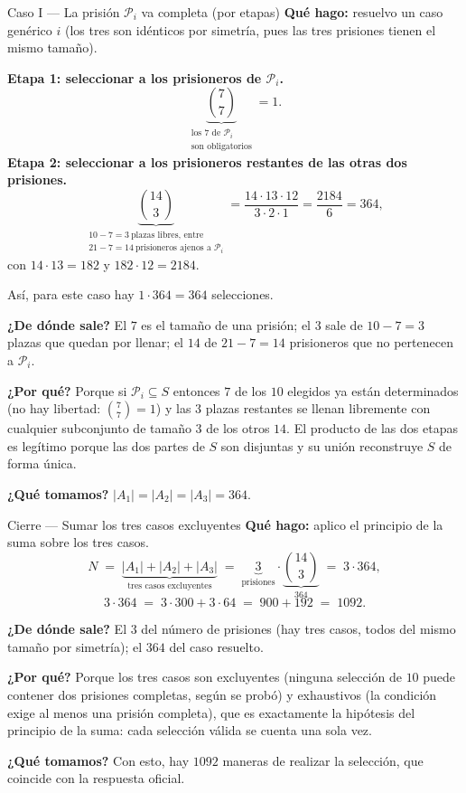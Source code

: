 \documentclass[11pt]{article}
\begin{document}
\begin{paso}{Caso I --- La prisi\'on $\mathcal{P}_i$ va completa (por etapas)}
\textbf{Qu\'e hago:} resuelvo un caso gen\'erico $i$ (los tres son id\'enticos por simetr\'ia, pues las tres
prisiones tienen el mismo tama\~no).

\medskip
\textbf{Etapa 1: seleccionar a los prisioneros de $\mathcal{P}_i$.}
\[
\underbrace{\binom{7}{7}}_{\substack{\text{los 7 de }\mathcal{P}_i\\ \text{son obligatorios}}}=1 .
\]
\textbf{Etapa 2: seleccionar a los prisioneros restantes de las otras dos prisiones.}
\[
\underbrace{\binom{14}{3}}_{\substack{10-7=3\ \text{plazas libres, entre}\\ 21-7=14\ \text{prisioneros ajenos a }\mathcal{P}_i}}
=\frac{14\cdot 13\cdot 12}{3\cdot 2\cdot 1}=\frac{2184}{6}=364 ,
\]
con $14\cdot 13=182$ y $182\cdot 12=2184$.

\medskip
As\'i, para este caso hay $1\cdot 364=364$ selecciones.

\textbf{¿De d\'onde sale?} El $7$ es el tama\~no de una prisi\'on; el $3$ sale de $10-7=3$ plazas que quedan
por llenar; el $14$ de $21-7=14$ prisioneros que no pertenecen a $\mathcal{P}_i$.

\textbf{¿Por qu\'e?} Porque si $\mathcal{P}_i\subseteq S$ entonces $7$ de los $10$ elegidos ya est\'an
determinados (no hay libertad: $\binom{7}{7}=1$) y las $3$ plazas restantes se llenan libremente con
cualquier subconjunto de tama\~no $3$ de los otros $14$. El producto de las dos etapas es leg\'itimo porque
las dos partes de $S$ son disjuntas y su uni\'on reconstruye $S$ de forma \'unica.

\textbf{¿Qu\'e tomamos?} $|A_1|=|A_2|=|A_3|=364$.
\end{paso}

\begin{paso}{Cierre --- Sumar los tres casos excluyentes}
\textbf{Qu\'e hago:} aplico el principio de la suma sobre los tres casos.
\[
N\;=\;\underbrace{|A_1|+|A_2|+|A_3|}_{\text{tres casos excluyentes}}
\;=\;\underbrace{3}_{\text{prisiones}}\cdot\underbrace{\binom{14}{3}}_{364}
\;=\;3\cdot 364 ,
\]
\[
3\cdot 364\;=\;3\cdot 300+3\cdot 64\;=\;900+192\;=\;1092 .
\]

\textbf{¿De d\'onde sale?} El $3$ del n\'umero de prisiones (hay tres casos, todos del mismo tama\~no por
simetr\'ia); el $364$ del caso resuelto.

\textbf{¿Por qu\'e?} Porque los tres casos son excluyentes (ninguna selecci\'on de $10$ puede contener dos
prisiones completas, seg\'un se prob\'o) y exhaustivos (la condici\'on exige al menos una prisi\'on
completa), que es exactamente la hip\'otesis del principio de la suma: cada selecci\'on v\'alida se cuenta
una sola vez.

\textbf{¿Qu\'e tomamos?} Con esto, hay $1092$ maneras de realizar la selecci\'on, que coincide con la
respuesta oficial.
\end{paso}
\end{document}
